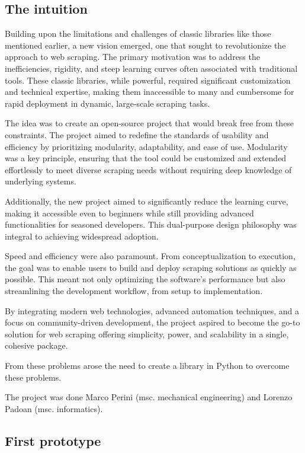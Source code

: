 \subsection{The intuition}
Building upon the limitations and challenges of classic libraries like those mentioned earlier, a new vision emerged, one that sought to revolutionize the approach to web scraping. The primary motivation was to address the inefficiencies, rigidity, and steep learning curves often associated with traditional tools. These classic libraries, while powerful, required significant customization and technical expertise, making them inaccessible to many and cumbersome for rapid deployment in dynamic, large-scale scraping tasks.

The idea was to create an open-source project that would break free from these constraints. The project aimed to redefine the standards of usability and efficiency by prioritizing modularity, adaptability, and ease of use. Modularity was a key principle, ensuring that the tool could be customized and extended effortlessly to meet diverse scraping needs without requiring deep knowledge of underlying systems.

Additionally, the new project aimed to significantly reduce the learning curve, making it accessible even to beginners while still providing advanced functionalities for seasoned developers. This dual-purpose design philosophy was integral to achieving widespread adoption.

Speed and efficiency were also paramount. From conceptualization to execution, the goal was to enable users to build and deploy scraping solutions as quickly as possible. This meant not only optimizing the software’s performance but also streamlining the development workflow, from setup to implementation.

By integrating modern web technologies, advanced automation techniques, and a focus on community-driven development, the project aspired to become the go-to solution for web scraping offering simplicity, power, and scalability in a single, cohesive package.

From these problems arose the need to create a library in Python to overcome these problems.

The project was done Marco Perini (msc. mechanical engineering) and Lorenzo Padoan (msc. informatics).

\subsection{First prototype}

